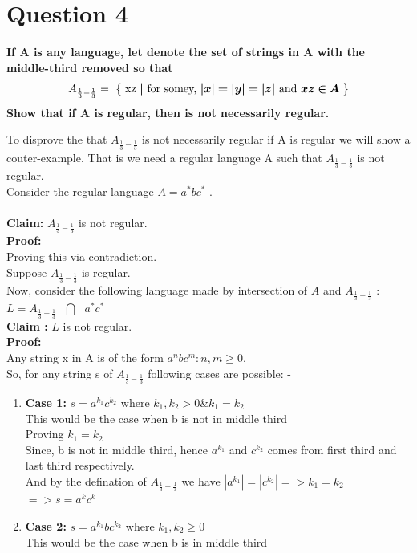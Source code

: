 \documentclass{article}
\begin{document}
\section{Question 4}
\textbf{If A is any language, let  denote the set of strings in A with the middle-third removed so that
         \[A_{\frac{1}{3}-\frac{1}{3}} = \text{ \{ xz \boldsymbol{$|$} for somey, \boldsymbol{$|x|=|y|=|z|$} and \boldsymbol{$xz \in A$} \}} \]
         Show that if A is regular, then  is not necessarily regular.\\}

To disprove the that $A_{\frac{1}{3}-\frac{1}{3}}$ is not necessarily regular if A is regular we will show a couter-example. That is we need a regular language A 
such that $A_{\frac{1}{3}-\frac{1}{3}}$ is not regular. \\
Consider the regular language $A = a^*bc^*$ .\\
\paragraph{}
\textbf{Claim: } $A_{\frac{1}{3}-\frac{1}{3}}$ is not regular.\\
\textbf{Proof: \\}
Proving this via contradiction.\\
Suppose $A_{\frac{1}{3}-\frac{1}{3}}$ is regular.\\
Now, consider the following language made by intersection of $A$ and $A_{\frac{1}{3}-\frac{1}{3}}$ :\\
$L = A_{\frac{1}{3}-\frac{1}{3}} \text{ } \bigcap \text{ } a^*c^* $\\

\textbf{Claim : } $L$ is not regular.\\
\textbf{Proof: }\\
Any string x in A is of the form $a^n b c^m : n,m \geq 0$.\\
So, for any string s of $A_{\frac{1}{3}-\frac{1}{3}}$ following cases are possible: -

\begin{enumerate}
    \item \textbf{Case 1: } $s = a^{k_1}c^{k_2}$ where $k_1,k_2 > 0 \& k_1 = k_2$\\
        This would be the case when b is not in middle third\\
        Proving $k_1 = k_2$\\
        Since, b is not in middle third, hence $a^{k_1}$ and $c^{k_2}$ comes from first third and last third respectively.\\
        And by the defination of $A_{\frac{1}{3}-\frac{1}{3}}$ we have $|a^{k_1}| = |c^{k_2}| => k_1 = k_2$\\
        $=> s = a^kc^k$
    \item \textbf{Case 2: } $s = a^{k_1}bc^{k_2}$ where $k_1,k_2 \geq 0$\\
    This would be the case when b is in middle third\\
\end{enumerate}
\end{document}
